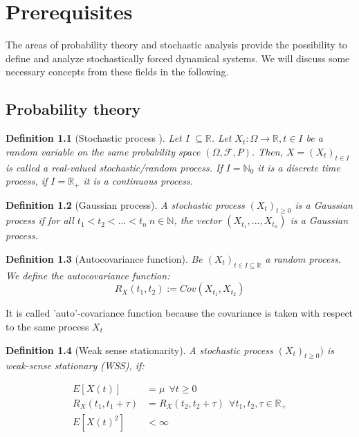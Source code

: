 \documentclass[%
thesis=student,%
coverpage=false,%
titlepage=false,%
headmarks=true, %
english,%
font=libertine, %
math=newpxtx, %
BCOR=5mm,%
coverBCOR=11mm%
]{tumbook}
\newtheorem{definition}{Definition}[section]
\begin{document}
\chapter{Prerequisites}

The areas of probability theory and stochastic analysis provide the possibility to define and analyze stochastically forced dynamical systems. We will discuss some necessary concepts from these fields in the following.

\section{Probability theory}

\begin{definition}[Stochastic process \cite{rolles:2023}]
Let I $\subseteq \mathbb{R}$. Let $X_{t}:\Omega \rightarrow \mathbb{R}, t \in I$ be a random variable on the same probability space $(\Omega,\mathcal{F},P)$. Then, $X = (X_{t})_{t \in I} $ is called a real-valued stochastic/random process. If $I = \mathbb{N}_{0}$ it is a discrete time process, if  $I = \mathbb{R}_{+}$ it is a continuous process.
\end{definition}


\begin{definition}[Gaussian process]
    A stochastic process $(X_{t})_{t\geq 0}$ is a Gaussian process if for all $t_{1} < t_{2} < ... < t_{n} \ n \in \mathbb{N}$, the vector $(X_{t_{1}},...,X_{t_{n}})$ is a Gaussian process.
\end{definition}


\begin{definition}[Autocovariance function]
Be $(X_{t})_{t \in I \subseteq \mathbb{R}}$ a random process. We define the autocovariance function: 
\[
R_{X}(t_{1},t_{2}) := Cov(X_{t_{1}},X_{t_{2}})
\]    
\end{definition}

It is called 'auto'-covariance function because the covariance is taken with respect to the same process $X_{t}$


\begin{definition}[Weak sense stationarity]
A stochastic process $(X_{t})_{t\geq 0})$ is weak-sense stationary (WSS), if:

\begin{subequations}
    \begin{align}
        E[X(t)] &= \mu \ \ \forall t \geq 0 \\
        R_{X}(t_{1},t_{1} + \tau) &= R_{X}(t_{2},t_{2} + \tau) \ \ \forall t_{1},t_{2},\tau \in \mathbb{R}_{+} \\
        E[X(t)^2]&<\infty
    \end{align}
\end{subequations}   
\end{definition}
\end{document}

